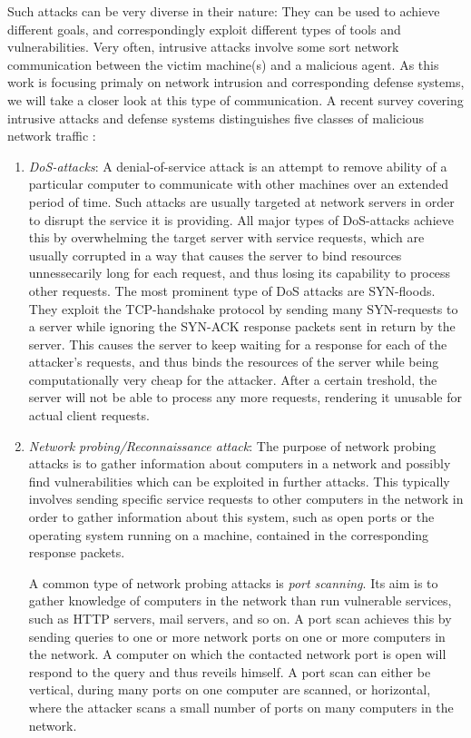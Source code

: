 \documentclass[a4paper,12pt,twoside]{report}
\begin{document}
Such attacks can be very diverse in their nature: They can be used to achieve different goals, and correspondingly exploit different types of tools and vulnerabilities. Very often, intrusive attacks involve some sort network communication between the victim machine(s) and a malicious agent. As this work is focusing primaly on network intrusion and corresponding defense systems, we will take a closer look at this type of communication. A recent survey covering intrusive attacks and defense systems distinguishes five classes of malicious network traffic \cite{nisioti2018intrusion}:

\begin{enumerate}
\item \textit{DoS-attacks}: A denial-of-service attack is an attempt to remove ability of a particular computer to communicate with other machines over an extended period of time. Such attacks are usually targeted at network servers in order to disrupt the service it is providing. All major types of DoS-attacks achieve this by overwhelming the target server with service requests, which are usually corrupted in a way that causes the server to bind resources unnessecarily long for each request, and thus losing its capability to process other requests. The most prominent type of DoS attacks are SYN-floods. They exploit the TCP-handshake protocol by sending many SYN-requests to a server while ignoring the SYN-ACK response packets sent in return by the server. This causes the server to keep waiting for a response for each of the attacker's requests, and thus binds the resources of the server while being computationally very cheap for the attacker. After a certain treshold, the server will not be able to process any more requests, rendering it unusable for actual client requests.

\item \textit{Network probing/Reconnaissance attack}: The purpose of network probing attacks is to gather information about computers in a network and possibly find vulnerabilities which can be exploited in further attacks. This typically involves sending specific service requests to other computers in the network in order to gather information about this system, such as open ports or the operating system running on a machine, contained in the corresponding response packets.

A common type of network probing attacks is \textit{port scanning}. Its aim is to gather knowledge of computers in the network than run vulnerable services, such as HTTP servers, mail servers, and so on. A port scan achieves this by sending queries to one or more network ports on one or more computers in the network. A computer on which the contacted network port is open will respond to the query and thus reveils himself. A port scan can either be vertical, during many ports on one computer are scanned, or horizontal, where the attacker scans a small number of ports on many computers in the network. 


\end{enumerate}
\end{document}
